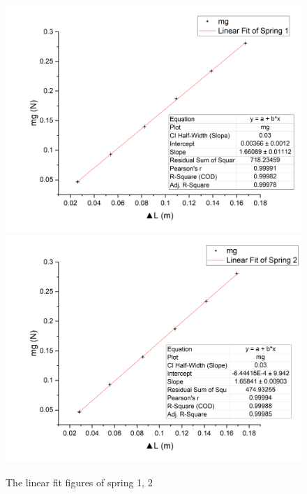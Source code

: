 \documentclass[11pt,a4paper]{article}
\begin{document}
\begin{center}
    \begin{figure}[H]
        \includegraphics[scale=0.35]{spring1-delta.png}
    \includegraphics[scale=0.35]{spring2-delta.png}
    \caption{The linear fit figures of spring 1, 2}
    \label{constantfigure}
    \end{figure}
\end{center}
\end{document}
